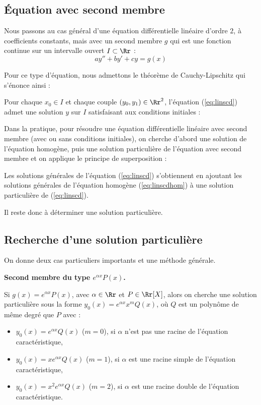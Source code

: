 \documentclass[class=report,crop=false]{standalone}
\begin{document}
\subsection{Équation avec second membre}

Nous passons au cas général d'une équation différentielle linéaire d'ordre $2$, à coefficients constants,
mais avec un second membre $g$ qui est une fonction continue sur
un intervalle ouvert $I \subset \Rr$ :
\begin{equation}
ay''+by'+cy=g(x)
\tag{$E$}
\end{equation}

Pour ce type d'équation, nous admettons le théorème de Cauchy-Lipschitz qui s'énonce ainsi :
\begin{theoreme}
Pour chaque $x_0\in I$ et chaque couple $(y_0,y_1) \in \Rr^2$,
l'équation (\ref{eq:linscd}) admet une 
solution $y$ sur $I$ satisfaisant aux conditions initiales :
\end{theoreme}


Dans la pratique, pour résoudre une équation différentielle linéaire avec second membre
(avec ou sans conditions initiales), on cherche d'abord une solution de l'équation homogène,
puis une solution particulière de l'équation avec second membre et on applique
le principe de superposition :
\begin{proposition}
Les solutions générales de l'équation (\ref{eq:linscd}) s'obtiennent en
ajoutant les solutions générales de l'équation homogène (\ref{eq:linscdhom})
à une solution particulière de (\ref{eq:linscd}).
\end{proposition}

Il reste donc à déterminer une solution particulière.

\subsection{Recherche d'une solution particulière}

On donne deux cas particuliers importants et une méthode générale.


\bigskip

\textbf{Second membre du type $e^{\alpha x}P(x)$.}

Si $g(x)=e^{\alpha x}P(x)$, avec $\alpha \in \Rr$ et $P\in \Rr[X]$,
alors on cherche une solution particulière sous la forme
$y_0(x)=e^{\alpha x}x^{m}Q(x)$, où $Q$ est un polynôme de
même degré que $P$ avec :
\begin{itemize}
\item $y_0(x)=e^{\alpha x}Q(x)$ ($m=0$), si $\alpha$ n'est pas une racine de l'équation caractéristique,
\item $y_0(x)=xe^{\alpha x}Q(x)$ ($m=1$), si $\alpha$ est une racine simple de l'équation caractéristique,
\item $y_0(x)=x^2e^{\alpha x}Q(x)$ ($m=2$), si $\alpha$ est une racine double de l'équation caractéristique.
\end{itemize}
\end{document}
